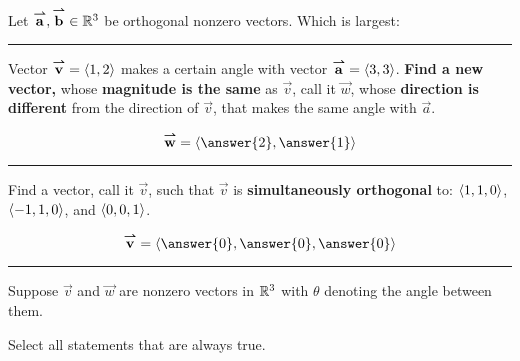 \documentclass{ximera}
\author{Bart Snapp and Darry Andrews}
\begin{document}
\begin{problem}
  Let ${\overset{\boldsymbol{\rightharpoonup}}{\mathbf{a}}},{\overset{\boldsymbol{\rightharpoonup}}{\mathbf{b}}}\in\mathbb R^3$ be orthogonal nonzero vectors. Which is
  largest:
  \begin{multipleChoice}
      \pdfOnly{\end{multicols}}
  \end{multipleChoice}

  \vspace{1cm}
  
\end{problem}

\hrule

\begin{problem}
  Vector ${\overset{\boldsymbol{\rightharpoonup}}{\mathbf{v}}} = \left\langle 1,2\right\rangle$ makes a certain angle with vector
  ${\overset{\boldsymbol{\rightharpoonup}}{\mathbf{a}}} = \left\langle 3,3\right\rangle$. \textbf{Find a new vector,} whose
  \textbf{magnitude is the same} as $\vec{v}$, call it $\vec{w}$, whose
  \textbf{direction is different} from the direction of $\vec{v}$,
  that makes the same angle with $\vec{a}$.
  \begin{prompt}
    \[
    \vec{w} = \vector{\answer{2},\answer{1}}
    \]
  \end{prompt}

  \vfill

\end{problem}

\hrule

\begin{problem}
  Find a vector, call it $\vec{v}$, such that $\vec{v}$ is
  \textbf{simultaneously orthogonal} to: $\left\langle 1,1,0\right\rangle$, $\left\langle -1,1,0\right\rangle$,
  and $\left\langle 0,0,1\right\rangle$.
  \begin{prompt}
    \[
    \vec{v} = \vector{\answer{0},\answer{0},\answer{0}}
    \]
  \end{prompt}

  \vfill
\end{problem}

\hrule

\begin{problem}
  Suppose $\vec{v}$ and $\vec{w}$ are nonzero vectors in $\mathbb R^3$ with
  $\theta$ denoting the angle between them. 
  \begin{prompt}
    Select all statements that are always true.
  \end{prompt}
  \begin{selectAll}
      \pdfOnly{\columnbreak}
      \pdfOnly{\end{multicols}}
  \end{selectAll}
\end{problem}
\end{document}
